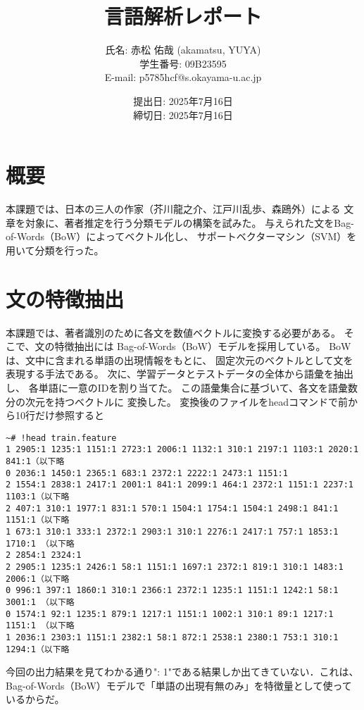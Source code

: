 \documentclass[autodetect-engine,dvi=dvipdfmx,ja=standard,
               a4j,11pt]{bxjsarticle}
\title{言語解析レポート}
\author{氏名: 赤松 佑哉 (akamatsu, YUYA) \\
        学生番号: 09B23595\\
        E-mail: p5785hcf@s.okayama-u.ac.jp}
\date{提出日: 2025年7月16日 \\
      締切日: 2025年7月16日 \\}  %
\begin{document}
\maketitle
\section{概要}
本課題では、日本の三人の作家（芥川龍之介、江戸川乱歩、森鴎外）による
文章を対象に、著者推定を行う分類モデルの構築を試みた。
与えられた文をBag-of-Words（BoW）によってベクトル化し、
サポートベクターマシン（SVM）を用いて分類を行った。
\section{文の特徴抽出}
本課題では、著者識別のために各文を数値ベクトルに変換する必要がある。
そこで、文の特徴抽出には Bag-of-Words（BoW）モデルを採用している。
BoWは、文中に含まれる単語の出現情報をもとに、
固定次元のベクトルとして文を表現する手法である。
次に、学習データとテストデータの全体から語彙を抽出し、
各単語に一意のIDを割り当てた。
この語彙集合に基づいて、各文を語彙数分の次元を持つベクトルに
変換した。
変換後のファイルをheadコマンドで前から10行だけ参照すると
\begin{verbatim}
~# !head train.feature
1 2905:1 1235:1 1151:1 2723:1 2006:1 1132:1 310:1 2197:1 1103:1 2020:1 841:1（以下略
0 2036:1 1450:1 2365:1 683:1 2372:1 2222:1 2473:1 1151:1
2 1554:1 2838:1 2417:1 2001:1 841:1 2099:1 464:1 2372:1 1151:1 2237:1 1103:1（以下略 
2 407:1 310:1 1977:1 831:1 570:1 1504:1 1754:1 1504:1 2498:1 841:1 1151:1（以下略 
1 673:1 310:1 333:1 2372:1 2903:1 310:1 2276:1 2417:1 757:1 1853:1 1710:1 （以下略
2 2854:1 2324:1
2 2905:1 1235:1 2426:1 58:1 1151:1 1697:1 2372:1 819:1 310:1 1483:1 2006:1（以下略 
0 996:1 397:1 1860:1 310:1 2366:1 2372:1 1235:1 1151:1 1242:1 58:1 3001:1 （以下略
0 1574:1 92:1 1235:1 879:1 1217:1 1151:1 1002:1 310:1 89:1 1217:1 1151:1 （以下略
1 2036:1 2303:1 1151:1 2382:1 58:1 872:1 2538:1 2380:1 753:1 310:1 1294:1（以下略
\end{verbatim}
今回の出力結果を見てわかる通り": 1"である結果しか出てきていない．これは、
Bag-of-Words（BoW）モデルで「単語の出現有無のみ」を特徴量として使っているからだ。
\end{document}

